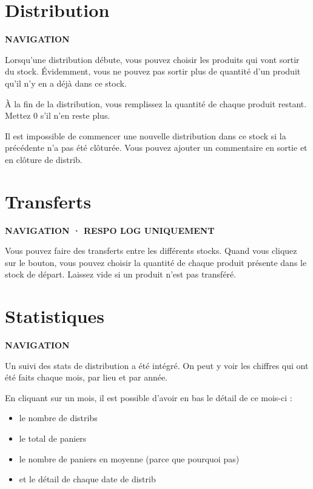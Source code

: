 \documentclass[11pt,a4paper]{article}
\newcommand{\eyebrow}[1]{{\sffamily\fontfamily{qag}\selectfont\bfseries\small\color{accentdark}\MakeUppercase{#1}}\par\vspace{2pt}}
\begin{document}
\section{Distribution}
\eyebrow{Navigation}

Lorsqu'une distribution débute, vous pouvez choisir les produits qui vont sortir du stock.
Évidemment, vous ne pouvez pas sortir plus de quantité d'un produit qu'il n'y en a déjà dans
ce stock.

\vspace{4pt}
À la fin de la distribution, vous remplissez la quantité de chaque produit restant. Mettez 0
s'il n'en reste plus.

\vspace{4pt}
Il est impossible de commencer une nouvelle distribution dans ce stock si la précédente n'a
pas été clôturée. Vous pouvez ajouter un commentaire en sortie et en clôture de distrib.

\vspace{6pt}

\section{Transferts}
\eyebrow{Navigation · Respo Log uniquement}

Vous pouvez faire des transferts entre les différents stocks. Quand vous cliquez sur le
bouton, vous pouvez choisir la quantité de chaque produit présente dans le stock de départ.
Laissez vide si un produit n'est pas transféré.

\vspace{6pt}

\newpage
\section{Statistiques}
\eyebrow{Navigation}

Un suivi des stats de distribution a été intégré. On peut y voir les chiffres qui ont été
faits chaque mois, par lieu et par année.

\vspace{4pt}
En cliquant sur un mois, il est possible d'avoir en bas le détail de ce mois-ci :
\begin{itemize}
  \item le nombre de distribs
  \item le total de paniers
  \item le nombre de paniers en moyenne (parce que pourquoi pas)
  \item et le détail de chaque date de distrib
\end{itemize}
\end{document}
